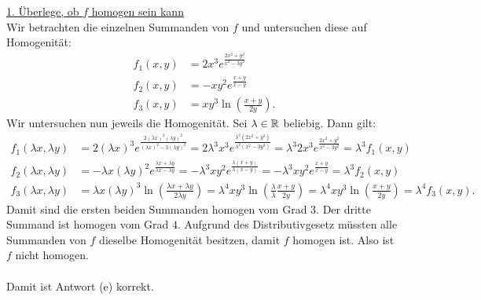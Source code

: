 \underline{1. Überlege, ob $ f $ homogen sein kann}\\
Wir betrachten die einzelnen Summanden von $ f $ und untersuchen diese auf Homogenität:
\begin{align*}
	f_1(x,y)
	&=
	2x^3 e^{\frac{2x^2+y^2}{x^2 - 3y^2}}\\
	f_2(x,y)
	&=
	-
	x y^2  e^{\frac{x+y}{x-y}}\\
	f_3(x,y)
	&=
	x y^3\ln \left( \frac{x+y}{2y} \right).
\end{align*} 
Wir untersuchen nun jeweils die Homogenität.
Sei $ \lambda \in \mathbb{R} $ beliebig. Dann gilt:
\begin{align*}
	f_1(\lambda x, \lambda y)
	&=
	2(\lambda x)^3 e^{\frac{2(\lambda x)^2 (\lambda y)^2} { (\lambda x)^2 - 3 (\lambda y)^2}}
	=
	2 \lambda^3 x^3 e^{\frac{\lambda^2( 2x^2+  y^2) } { \lambda^2(x^2 - 3y^2) }}
	=
	\lambda^3 2  x^3 e^{\frac{ 2x^2+  y^2}{ x^2 - 3y^2}}
	= \lambda^3 f_1(x,y)
	\\
	f_2(\lambda x, \lambda y)
	&=
	-
	\lambda x (\lambda y)^2 e^{\frac{\lambda x+ \lambda y}{ \lambda x- \lambda y}}
	=
	-
	\lambda^3 xy^2 e^{\frac{\lambda (x+  y)}{ \lambda (x-  y)}}
	=
	-
	\lambda^3 xy^2 e^{\frac{x+  y}{  x-  y}}
	=
	\lambda^3 f_2(x,y)\\
	f_3(\lambda x, \lambda y)
	&=
	\lambda x (\lambda y)^3 \ln \left( \frac{\lambda x + \lambda y}{2 \lambda y} \right)
	=
	\lambda^4 x y^3 \ln \left(\frac{\lambda}{\lambda} \frac{ x + y}{ 2y} \right)
	=
	\lambda^4 x y^3 \ln \left( \frac{ x + y}{ 2y} \right)
	=
	\lambda^4 f_3(x,y).
\end{align*}
Damit sind die ersten beiden Summanden homogen vom Grad $ 3 $.
Der dritte Summand ist homogen vom Grad $ 4 $. Aufgrund des Distributivgesetz müssten alle Summanden von $ f $ dieselbe Homogenität besitzen, damit $ f $ homogen ist. Also ist $ f $ nicht homogen.\\
\\
Damit ist Antwort (e) korrekt.


\newpage

